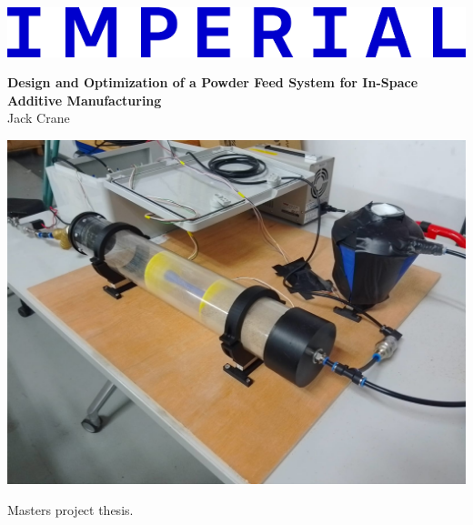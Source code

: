 \documentclass[11pt,a4paper]{report}
\begin{document}
\begin{titlepage}

    \noindent
    \begin{minipage}{0.5\textwidth}
        \includegraphics[width=\linewidth]{../report_assets/imperial.png}
    \end{minipage}
    \hfill
    
    \vspace{1cm} %
    \begin{center}
        {\huge \textbf{Design and Optimization of a Powder Feed System for In-Space Additive Manufacturing}}\\[1cm]
        {\Large Jack Crane}\\[1cm]

        \begin{minipage}{0.8\textwidth}
            \includegraphics[width=\linewidth]{../report_assets/cover_image.png}
        \end{minipage}
        \hfill
        
        \vspace{1cm} %

        Masters project thesis.\\


\end{center}
\end{titlepage}
\end{document}

